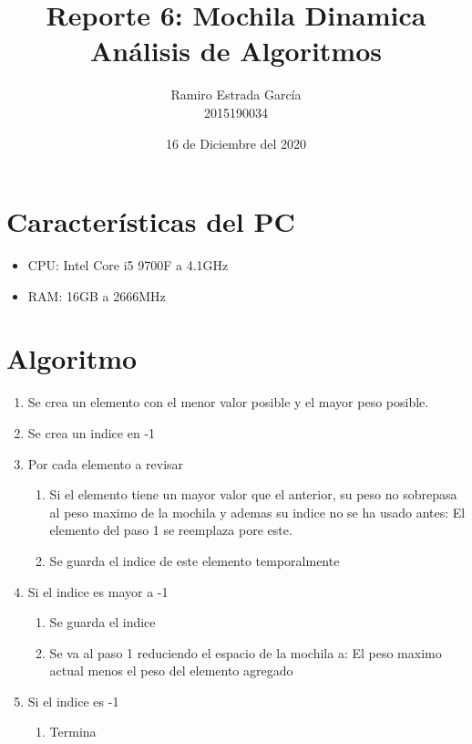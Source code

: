 \documentclass{article}
\title{Reporte 6: Mochila Dinamica\\\textbf{Análisis de Algoritmos}}
\author{ Ramiro Estrada García\\2015190034 }
\date{16 de Diciembre del 2020}
\begin{document}
\maketitle
\vspace{5cm}
\section {Características del PC}
\begin{itemize}
	\item CPU: Intel Core i5 9700F a 4.1GHz
	\item RAM: 16GB a 2666MHz
\end{itemize}
\newpage
\maketitle
\section{Algoritmo}
\begin{enumerate}
	\item Se crea un elemento con el menor valor posible y el mayor peso posible.
	\item Se crea un indice en -1
	\item Por cada elemento a revisar
	\begin{enumerate}
        \item Si el elemento tiene un mayor valor que el anterior, su peso no sobrepasa al peso maximo de la mochila y ademas su indice no se ha usado antes: El elemento del paso 1 se reemplaza pore este.
        \item Se guarda el indice de este elemento temporalmente
    \end{enumerate}
    \item Si el indice es mayor a -1
    \begin{enumerate}
        \item Se guarda el indice
        \item Se va al paso 1 reduciendo el espacio de la mochila a: El peso maximo actual menos el peso del elemento agregado
    \end{enumerate}
    \item Si el indice es -1
    \begin{enumerate}
        \item Termina
    \end{enumerate}
\end{enumerate}
\maketitle
\end{document}
